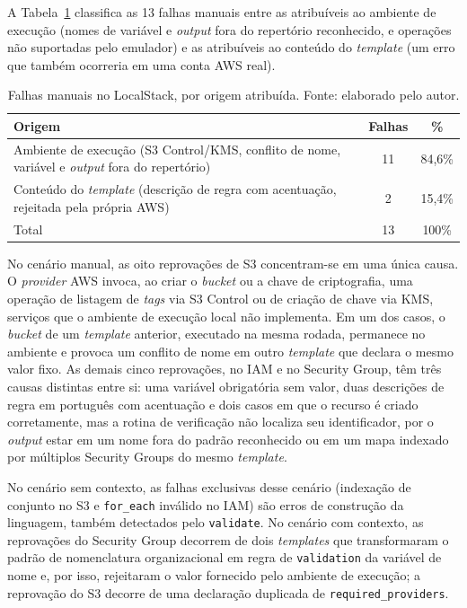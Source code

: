 A Tabela~\ref{tab:localstack-atribuicao} classifica as 13 falhas manuais entre as atribuíveis ao ambiente de execução (nomes de variável e \textit{output} fora do repertório reconhecido, e operações não suportadas pelo emulador) e as atribuíveis ao conteúdo do \textit{template} (um erro que também ocorreria em uma conta AWS real).

\begin{table}[H]
\centering
\caption{Falhas manuais no LocalStack, por origem atribuída. Fonte: elaborado pelo autor.}
\label{tab:localstack-atribuicao}
\small
\begin{tabularx}{\textwidth}{>{\raggedright\arraybackslash}X|c|c}
\hline
\textbf{Origem} & \textbf{Falhas} & \textbf{\%} \\
\hline
Ambiente de execução (S3 Control/KMS, conflito de nome, variável e \textit{output} fora do repertório) & 11 & 84,6\% \\
\hline
Conteúdo do \textit{template} (descrição de regra com acentuação, rejeitada pela própria AWS) & 2 & 15,4\% \\
\hline
Total & 13 & 100\% \\
\hline
\end{tabularx}
\end{table}

No cenário manual, as oito reprovações de S3 concentram-se em uma única causa. O \textit{provider} AWS invoca, ao criar o \textit{bucket} ou a chave de criptografia, uma operação de listagem de \textit{tags} via S3 Control ou de criação de chave via KMS, serviços que o ambiente de execução local não implementa. Em um dos casos, o \textit{bucket} de um \textit{template} anterior, executado na mesma rodada, permanece no ambiente e provoca um conflito de nome em outro \textit{template} que declara o mesmo valor fixo. As demais cinco reprovações, no IAM e no Security Group, têm três causas distintas entre si: uma variável obrigatória sem valor, duas descrições de regra em português com acentuação e dois casos em que o recurso é criado corretamente, mas a rotina de verificação não localiza seu identificador, por o \textit{output} estar em um nome fora do padrão reconhecido ou em um mapa indexado por múltiplos Security Groups do mesmo \textit{template}.

No cenário sem contexto, as falhas exclusivas desse cenário (indexação de conjunto no S3 e \texttt{for\_each} inválido no IAM) são erros de construção da linguagem, também detectados pelo \texttt{validate}. No cenário com contexto, as reprovações do Security Group decorrem de dois \textit{templates} que transformaram o padrão de nomenclatura organizacional em regra de \texttt{validation} da variável de nome e, por isso, rejeitaram o valor fornecido pelo ambiente de execução; a reprovação do S3 decorre de uma declaração duplicada de \texttt{required\_providers}.

